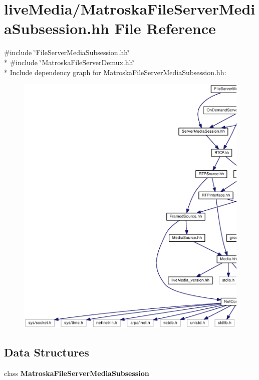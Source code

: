 \section{live\+Media/\+Matroska\+File\+Server\+Media\+Subsession.hh File Reference}
\label{MatroskaFileServerMediaSubsession_8hh}
{\ttfamily \#include \char`\"{}File\+Server\+Media\+Subsession.\+hh\char`\"{}}\\*
{\ttfamily \#include \char`\"{}Matroska\+File\+Server\+Demux.\+hh\char`\"{}}\\*
Include dependency graph for Matroska\+File\+Server\+Media\+Subsession.\+hh\+:
\nopagebreak
\begin{figure}[H]
\begin{center}
\leavevmode
\includegraphics[width=350pt]{MatroskaFileServerMediaSubsession_8hh__incl}
\end{center}
\end{figure}
\subsection*{Data Structures}
\begin{DoxyCompactItemize}
\item 
class {\bf Matroska\+File\+Server\+Media\+Subsession}
\end{DoxyCompactItemize}
